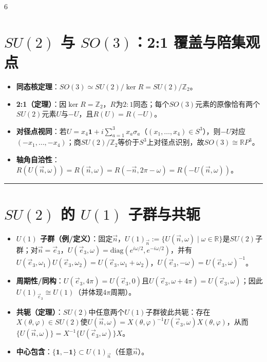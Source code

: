 \documentclass[landscape]{article}
\begin{document}
\begin{multicols*}{6}
\section*{$SU(2)$ 与 $SO(3)$：2:1 覆盖与陪集观点}
\begin{itemize}
  \item \textbf{同态核定理}：$SO(3)\simeq SU(2)/\ker R=SU(2)/\mathbb{Z}_2$。
  \item \textbf{2:1（定理）}：因$\ker R=\mathbb{Z}_2$，$R$为$2:1$同态；每个$SO(3)$元素的原像恰有两个$SU(2)$元素$U$与$-U$，且$R(U)=R(-U)$。
  \item \textbf{对径点视同}：若$U=x_4\mathbf{1}+i\sum_{a=1}^3 x_a\sigma_a$（$(x_1,\dots,x_4)\in S^3$），则$-U$对应$(-x_1,\dots,-x_4)$；商$SU(2)/\mathbb{Z}_2$等价于$S^3$上对径点识别，故$SO(3)\cong \mathbb{R}P^{3}$。
  \item \textbf{轴角自洽性}：$R(U(\vec n,\omega))=R(\vec n,\omega)=R(-\vec n,2\pi-\omega)=R(-U(\vec n,\omega))$。
\end{itemize}
\noindent\textcolor{blue}{\rule{\linewidth}{1pt}}
\section*{$SU(2)$ 的 $U(1)$ 子群与共轭}
\begin{itemize}
  \item \textbf{$U(1)$ 子群（例/定义）}：固定$\vec n$，$U(1)_{\vec n}:=\{U(\vec n,\omega)\mid \omega\in\mathbb{R}\}$是$SU(2)$子群；对$\vec n=\vec e_3$，$U(\vec e_3,\omega)=\mathrm{diag}(e^{i\omega/2},e^{-i\omega/2})$，并有$U(\vec e_3,\omega_1)U(\vec e_3,\omega_2)=U(\vec e_3,\omega_1+\omega_2)$，$U(\vec e_3,-\omega)=U(\vec e_3,\omega)^{-1}$。
  \item \textbf{周期性/同构}：$U(\vec e_3,4\pi)=U(\vec e_3,0)$且$U(\vec e_3,\omega+4\pi)=U(\vec e_3,\omega)$；因此$U(1)_{\vec e_3}\cong U(1)$（并体现$4\pi$周期）。
  \item \textbf{共轭（定理）}：$SU(2)$中任意两个$U(1)$子群彼此共轭：存在$X(\theta,\varphi)\in SU(2)$使$U(\vec n,\omega)=X(\theta,\varphi)^{-1}U(\vec e_3,\omega)X(\theta,\varphi)$，从而$\{U(\vec n,\omega)\}=X^{-1}\{U(\vec e_3,\omega)\}X$。
  \item \textbf{中心包含}：$\{\mathbf{1},-\mathbf{1}\}\subset U(1)_{\vec n}$（任意$\vec n$）。
\end{itemize}


\end{multicols*}
\end{document}
